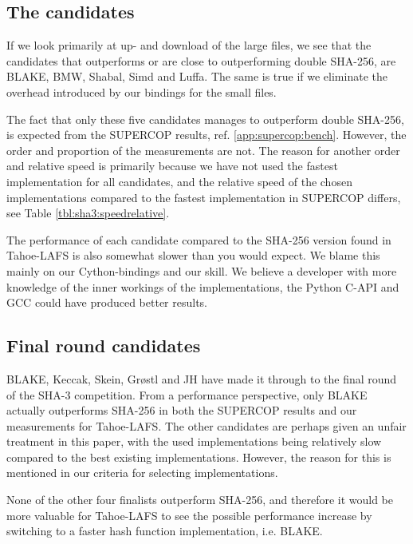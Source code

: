 \documentclass[english,12pt,a4paper]{book}
\begin{document}
\subsection{The candidates}

If we look primarily at up- and download of the large files, we see that the candidates
that outperforms or are close to outperforming double \ac{SHA}-256, are BLAKE,
\ac{BMW}, Shabal, Simd and Luffa. The same is true if we eliminate the overhead
introduced by our bindings for the small files.

The fact that only these five candidates manages to outperform double
\ac{SHA}-256, is expected from the \ac{SUPERCOP} results, ref.
\autoref{app:supercop:bench}. However, the order and proportion of the
measurements are not. The reason for another order and relative speed is
primarily because we have not used the fastest implementation for all
candidates, and the relative speed of the chosen implementations compared to the
fastest implementation in \ac{SUPERCOP} differs, see Table
\ref{tbl:sha3:speedrelative}.

The performance of each candidate compared to the \ac{SHA}-256 version found in
Tahoe-\ac{LAFS} is also somewhat slower than you would expect. We blame this
mainly on our Cython-bindings and our skill. We believe a developer with more
knowledge of the inner workings of the implementations, the Python C-\ac{API}
and \ac{GCC} could have produced better results.

\subsection{Final round candidates}

BLAKE, Keccak, Skein, Grøstl and JH have made it through to the final round of
the \ac{SHA}-3 competition. From a performance perspective, only BLAKE actually
outperforms \ac{SHA}-256 in both the \ac{SUPERCOP} results and our measurements
for Tahoe-\ac{LAFS}. The other candidates are perhaps given an unfair treatment
in this paper, with the used implementations being relatively slow compared to
the best existing implementations. However, the reason for this is mentioned in
our criteria for selecting implementations.

None of the other four finalists outperform \ac{SHA}-256, and therefore it would be
more valuable for Tahoe-\ac{LAFS} to see the possible performance increase by
switching to a faster hash function implementation, i.e. BLAKE.
\end{document}
